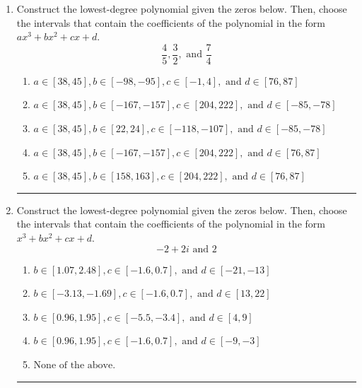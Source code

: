 \documentclass[14pt]{extbook}
\newcommand{\litem}[1]{\item#1\hspace*{-1cm}\rule{\textwidth}{0.4pt}}
\begin{document}
\begin{enumerate}
\litem{
Construct the lowest-degree polynomial given the zeros below. Then, choose the intervals that contain the coefficients of the polynomial in the form $ax^3+bx^2+cx+d$.\[ \frac{4}{5}, \frac{3}{2}, \text{ and } \frac{7}{4} \]\begin{enumerate}[label=\Alph*.]
\item \( a \in [38, 45], b \in [-98, -95], c \in [-1, 4], \text{ and } d \in [76, 87] \)
\item \( a \in [38, 45], b \in [-167, -157], c \in [204, 222], \text{ and } d \in [-85, -78] \)
\item \( a \in [38, 45], b \in [22, 24], c \in [-118, -107], \text{ and } d \in [-85, -78] \)
\item \( a \in [38, 45], b \in [-167, -157], c \in [204, 222], \text{ and } d \in [76, 87] \)
\item \( a \in [38, 45], b \in [158, 163], c \in [204, 222], \text{ and } d \in [76, 87] \)

\end{enumerate} }
\litem{
Construct the lowest-degree polynomial given the zeros below. Then, choose the intervals that contain the coefficients of the polynomial in the form $x^3+bx^2+cx+d$.\[ -2 + 2 i \text{ and } 2 \]\begin{enumerate}[label=\Alph*.]
\item \( b \in [1.07, 2.48], c \in [-1.6, 0.7], \text{ and } d \in [-21, -13] \)
\item \( b \in [-3.13, -1.69], c \in [-1.6, 0.7], \text{ and } d \in [13, 22] \)
\item \( b \in [0.96, 1.95], c \in [-5.5, -3.4], \text{ and } d \in [4, 9] \)
\item \( b \in [0.96, 1.95], c \in [-1.6, 0.7], \text{ and } d \in [-9, -3] \)
\item \( \text{None of the above.} \)


\end{enumerate}}
\end{enumerate}
\end{document}
